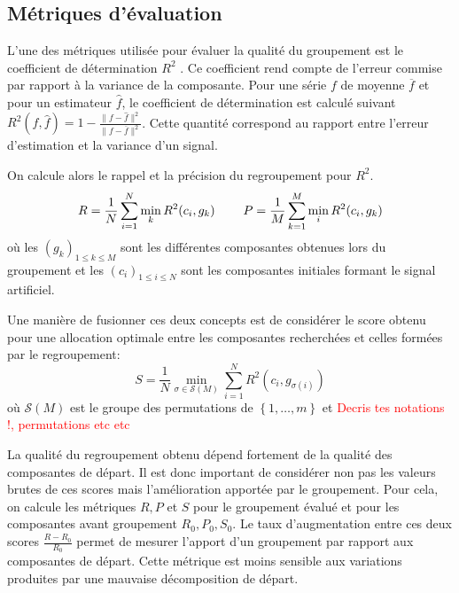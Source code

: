 \documentclass{gretsi}
\newcommand{\set}[1]{\left \{ 1, \dots, #1 \right \}}
\begin{document}

\subsection{Métriques d'évaluation}
\label{sub:met}

    L'une des métriques utilisée pour évaluer la qualité du groupement est le coefficient de détermination $R^2$ \cite{abalov_14_auto}.
    Ce coefficient rend compte de l'erreur commise par rapport à la variance de la composante.
    Pour une série $f$ de moyenne $\overline f$ et pour un estimateur $\widehat f$, le coefficient de détermination est calculé suivant $R^2(f, \widehat f) = 1 - \frac{\|f-\widehat f\|^2}{\|f-\overline f\|^2}$.
    Cette quantité correspond au rapport entre l'erreur d'estimation et la variance d'un signal.

    On calcule alors le rappel et la précision du regroupement pour $R^2$.
    \begin{equation*}
        R = \frac{1}{N} \sum_{i=1}^N \min_k R^2(c_i, g_k) \hspace{0.8cm} P = \frac{1}{M}\sum_{k=1}^M \min_i R^2(c_i, g_k)
    \end{equation*}
    où les $(g_k)_{1\le k \le M}$ sont les différentes composantes obtenues lors du groupement et les $(c_i)_{1\le i\le N}$ sont les composantes initiales formant le signal artificiel.
    
    Une manière de fusionner ces deux concepts est de considérer le score obtenu pour une allocation optimale entre les composantes recherchées et celles formées par le regroupement:
    \begin{equation*}
        S =  \frac{1}{N} \min_{\sigma \in \mathcal S(M)} \sum_{i=1}^N R^2(c_i, g_{\sigma(i)})
    \end{equation*}
    où $\mathcal S(M)$ est le groupe des permutations de $\set{m}$ et \textcolor{red}{Decris tes notations !, permutations etc etc}
    
    La qualité du regroupement obtenu dépend fortement de la qualité des composantes de départ.
    Il est donc important de considérer non pas les valeurs brutes de ces scores mais l'amélioration apportée par le groupement.
    Pour cela, on calcule les métriques $R, P$ et $S$ pour le groupement évalué et pour les composantes avant groupement $R_0, P_0, S_0$.
    Le taux d'augmentation entre ces deux scores $\frac{R-R_0}{R_0}$ permet de mesurer l'apport d'un groupement par rapport aux composantes de départ.
    Cette métrique est moins sensible aux variations produites par une mauvaise décomposition de départ.
    
\end{document}

